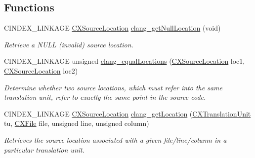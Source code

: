 \subsection*{Functions}
\begin{DoxyCompactItemize}
\item 
\mbox{\label{group__CINDEX__LOCATIONS_ga79db06b88e567b1da41620fd96c51787}} 
C\+I\+N\+D\+E\+X\+\_\+\+L\+I\+N\+K\+A\+GE \hyperlink{structCXSourceLocation}{C\+X\+Source\+Location} \hyperlink{group__CINDEX__LOCATIONS_ga79db06b88e567b1da41620fd96c51787}{clang\+\_\+get\+Null\+Location} (void)
\begin{DoxyCompactList}\small\item\em Retrieve a N\+U\+LL (invalid) source location. \end{DoxyCompactList}\item 
C\+I\+N\+D\+E\+X\+\_\+\+L\+I\+N\+K\+A\+GE unsigned \hyperlink{group__CINDEX__LOCATIONS_gabb1ee8108ded5d3eafa6d059eb473ef8}{clang\+\_\+equal\+Locations} (\hyperlink{structCXSourceLocation}{C\+X\+Source\+Location} loc1, \hyperlink{structCXSourceLocation}{C\+X\+Source\+Location} loc2)
\begin{DoxyCompactList}\small\item\em Determine whether two source locations, which must refer into the same translation unit, refer to exactly the same point in the source code. \end{DoxyCompactList}\item 
\mbox{\label{group__CINDEX__LOCATIONS_ga86d822034407d60d9e1f36e07cbc0f67}} 
C\+I\+N\+D\+E\+X\+\_\+\+L\+I\+N\+K\+A\+GE \hyperlink{structCXSourceLocation}{C\+X\+Source\+Location} \hyperlink{group__CINDEX__LOCATIONS_ga86d822034407d60d9e1f36e07cbc0f67}{clang\+\_\+get\+Location} (\hyperlink{group__CINDEX_gacdb7815736ca709ce9a5e1ec2b7e16ac}{C\+X\+Translation\+Unit} tu, \hyperlink{group__CINDEX__FILES_gacfcea9c1239c916597e2e5b3e109215a}{C\+X\+File} file, unsigned line, unsigned column)
\begin{DoxyCompactList}\small\item\em Retrieves the source location associated with a given file/line/column in a particular translation unit. \end{DoxyCompactList}\item 
\mbox{\label{group__CINDEX__LOCATIONS_gab6f5b1cc0761131ccfd1dc8cdca1f6d8}} 

\end{DoxyCompactItemize}
